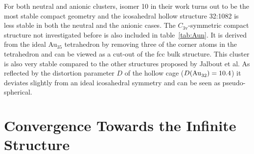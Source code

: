 %
For both neutral and anionic clusters, isomer 10 in their work turns out to be
the most stable compact geometry and the icosahedral hollow structure 32:1082 is
less stable in both the neutral and the anionic cases. The
$C_\mathrm{3v}$-symmetric compact structure not investigated before is also
included in table~\ref{tab:Aun}. It is derived from the ideal Au$_{35}$
tetrahedron by removing three of the corner atoms in the tetrahedron and can
be viewed as a cut-out of the \ac{fcc} bulk structure. This cluster is also very
stable compared to the other structures proposed by Jalbout et al. As reflected
by the distortion parameter $D$ of the  hollow cage
($D(\ce{Au32})=10.4$) it deviates slightly from an ideal icosahedral symmetry
and can be seen as pseudo-spherical.
  
\section{Convergence Towards the Infinite Structure}

